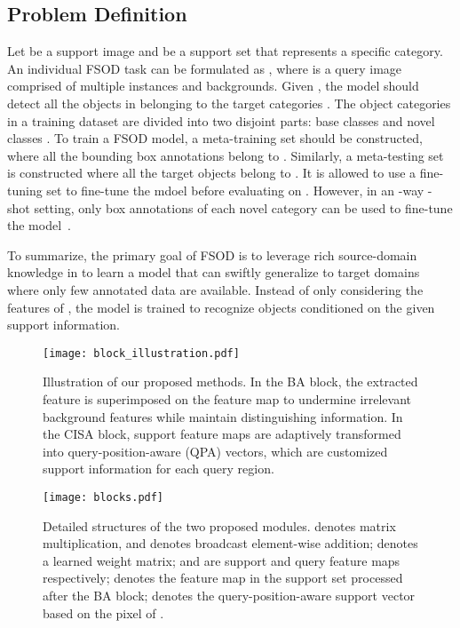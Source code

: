 \documentclass[journal]{IEEEtran}
\begin{document}
\subsection{Problem Definition}
Let  be a support image and  be a support set that represents a specific category.
An individual FSOD task can be formulated as , where  is a query image comprised of multiple instances and backgrounds.  
Given , the model should detect all the objects in  belonging to the target categories .
The object categories in a training dataset are divided into two disjoint parts: base classes  and novel classes . 
To train a FSOD model, a meta-training set  should be constructed, where all the bounding box annotations belong to .
Similarly, a meta-testing set  is constructed where all the target objects belong to . 
It is allowed to use a fine-tuning set  to fine-tune the mdoel before evaluating on .
However, in an -way -shot setting, only  box annotations of each novel category can be used to fine-tune the model~\cite{karlinsky2019repmet, kang2019few}.


To summarize, the primary goal of FSOD is to leverage rich source-domain knowledge in  to learn a model that can swiftly generalize to target domains where only few annotated data are available.
Instead of only considering the features of , the model  is trained to recognize objects conditioned on the given support information.



\begin{figure}[t]
    \centering
    \texttt{[image: block\_illustration.pdf]}
    \caption{Illustration of our proposed methods. 
    In the BA block, the extracted feature is superimposed on the feature map to undermine irrelevant background features while maintain distinguishing information. 
    In the CISA block, support feature maps are adaptively transformed into query-position-aware (QPA) vectors, which are customized support information for each query region.
}
    \label{fig:block_illustration}
\end{figure}
\begin{figure}[t]
    \centering
    \texttt{[image: blocks.pdf]}
    \caption{Detailed structures of the two proposed modules.  denotes matrix multiplication, and  denotes broadcast element-wise addition;  denotes a learned weight matrix;   and  are support and query feature maps respectively;  denotes the  feature map in the support set processed after the BA block;  denotes the query-position-aware support vector based on the  pixel of .
    }
    \label{fig:blocks}
\end{figure}
\end{document}
